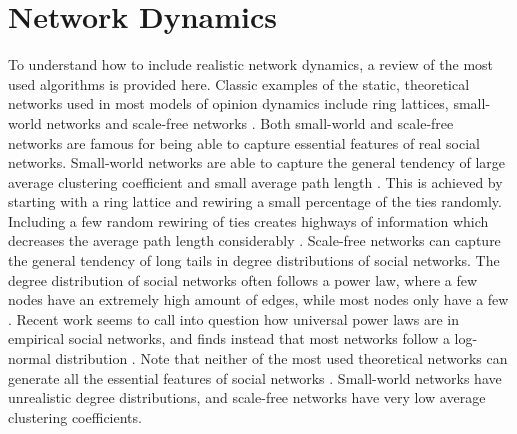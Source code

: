 \documentclass[11pt]{article}
\begin{document}
\section{Network Dynamics}
To understand how to include realistic network dynamics, a review of the most used algorithms is provided here.
Classic examples of the static, theoretical networks used in most models of opinion dynamics include ring lattices, small-world networks and scale-free networks \cite{barabasi_scale-free_2003,watts_collective_1998}. Both small-world and scale-free networks are famous for being able to capture essential features of real social networks. Small-world networks are able to capture the general tendency of large average clustering coefficient and small average path length \cite{watts_collective_1998}. This is achieved by starting with a ring lattice and rewiring a small percentage of the ties randomly. Including a few random rewiring of ties creates highways of information which decreases the average path length considerably \cite{watts_collective_1998}. Scale-free networks can capture the general tendency of long tails in degree distributions of social networks. The degree distribution of social networks often follows a power law, where a few nodes have an extremely high amount of edges, while most nodes only have a few \cite{barabasi_scale-free_2003}. Recent work seems to call into question how universal power laws are in empirical social networks, and finds instead that most networks follow a log-normal distribution \cite{broido_scale-free_2019}. Note that neither of the most used theoretical networks can generate all the essential features of social networks \cite{jackson_search_2004}. Small-world networks have unrealistic degree distributions, and scale-free networks have very low average clustering coefficients. 
\end{document}

